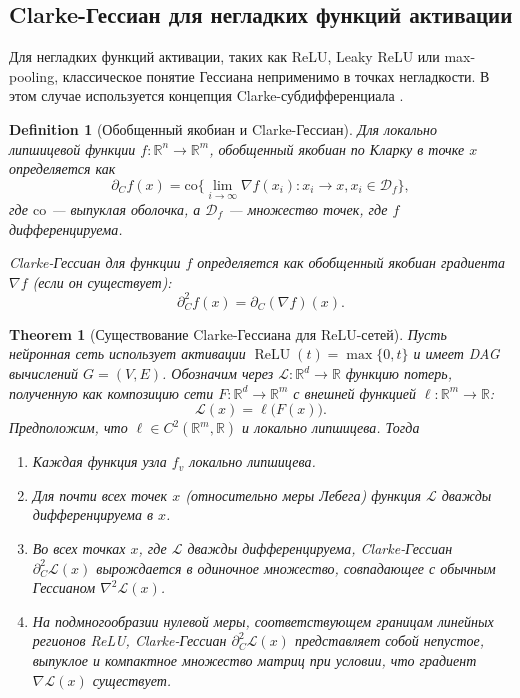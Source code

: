 \documentclass[11pt]{article}
\newtheorem{theorem}{Theorem}
\newtheorem{definition}{Definition}
\begin{document}
\subsection{Clarke-Гессиан для негладких функций активации}

Для негладких функций активации, таких как ReLU, Leaky ReLU или max-pooling, классическое понятие Гессиана
неприменимо в точках негладкости. В этом случае используется концепция Clarke-субдифференциала
\citep{clarke1990optimization}.

\begin{definition}[Обобщенный якобиан и Clarke-Гессиан]
  Для локально липшицевой функции $f: \mathbb{R}^n \to \mathbb{R}^m$, обобщенный якобиан по Кларку в точке
  $x$ определяется как
  \[
    \partial_C f(x) = \mathrm{co}\{\lim_{i\to\infty} \nabla f(x_i) : x_i \to x, x_i \in \mathcal{D}_f\},
  \]
  где $\mathrm{co}$ — выпуклая оболочка, а $\mathcal{D}_f$ — множество точек, где $f$ дифференцируема.

  Clarke-Гессиан для функции $f$ определяется как обобщенный якобиан градиента $\nabla f$ (если он существует):
  \[
    \partial_C^2 f(x) = \partial_C(\nabla f)(x).
  \]
\end{definition}

\begin{theorem}[Существование Clarke-Гессиана для ReLU-сетей]
  Пусть нейронная сеть использует активации $\operatorname{ReLU}(t)=\max\{0,t\}$
  и имеет DAG вычислений $G=(V,E)$.
  Обозначим через $\mathcal L:\mathbb R^{d}\to\mathbb R$ функцию потерь,
  полученную как композицию сети $F:\mathbb R^{d}\to\mathbb R^{m}$ с вне­шней
  функцией $\ell:\mathbb R^{m}\to\mathbb R$:
  \[
    \mathcal L(x)=\ell\bigl(F(x)\bigr).
  \]
  Предположим, что $\ell \in C^2(\mathbb{R}^m, \mathbb{R})$ и локально липшицева. Тогда

  \begin{enumerate}
    \item Каждая функция узла $f_v$ локально липшицева.
    \item Для почти всех точек $x$ (относительно меры Лебега) функция $\mathcal L$ дважды дифференцируема в $x$.
    \item Во всех точках $x$, где $\mathcal L$ дважды дифференцируема,
      Clarke-Гессиан $\partial^2_C\mathcal L(x)$ вырождается в одиночное множество,
      совпадающее с обычным Гессианом $\nabla^{2}\mathcal L(x)$.
    \item На подмногообразии нулевой меры, соответствующем границам линейных регионов ReLU,
      Clarke-Гессиан $\partial^2_C\mathcal L(x)$ представляет собой
      непустое, выпуклое и компактное множество матриц при условии, что градиент $\nabla \mathcal L(x)$ существует.
  \end{enumerate}
\end{theorem}
\end{document}
